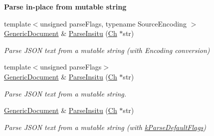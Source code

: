 \begin{Indent}{\bf Parse in-\/place from mutable string}\par
\begin{DoxyCompactItemize}
\item 
{\footnotesize template$<$unsigned parse\+Flags, typename Source\+Encoding $>$ }\\\hyperlink{class_generic_document}{Generic\+Document} \& \hyperlink{class_generic_document_a2daaaf5c1fa72fa83612dafe69b71166}{Parse\+Insitu} (\hyperlink{class_generic_value_ade0e0ce64ccd5d852da57a35e720bafb}{Ch} $\ast$str)
\begin{DoxyCompactList}\small\item\em Parse J\+S\+O\+N text from a mutable string (with Encoding conversion) \end{DoxyCompactList}\item 
{\footnotesize template$<$unsigned parse\+Flags$>$ }\\\hyperlink{class_generic_document}{Generic\+Document} \& \hyperlink{class_generic_document_a301f8f297a5a0da4b6be5459ad766f75}{Parse\+Insitu} (\hyperlink{class_generic_value_ade0e0ce64ccd5d852da57a35e720bafb}{Ch} $\ast$str)
\begin{DoxyCompactList}\small\item\em Parse J\+S\+O\+N text from a mutable string. \end{DoxyCompactList}\item 
\hyperlink{class_generic_document}{Generic\+Document} \& \hyperlink{class_generic_document_a81922881357539d5482d31aea14b5664}{Parse\+Insitu} (\hyperlink{class_generic_value_ade0e0ce64ccd5d852da57a35e720bafb}{Ch} $\ast$str)
\begin{DoxyCompactList}\small\item\em Parse J\+S\+O\+N text from a mutable string (with \hyperlink{reader_8h_ab7be7dabe6ffcba60fad441505583450a9104b0946d648e9467cb7a967401ec80}{k\+Parse\+Default\+Flags}) \end{DoxyCompactList}\end{DoxyCompactItemize}
\end{Indent}

